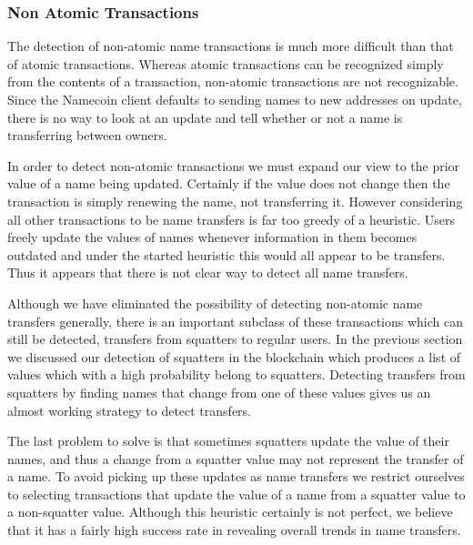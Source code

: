\subsubsection{Non Atomic Transactions}

The detection of non-atomic name transactions is much more difficult than that of atomic transactions. Whereas atomic transactions can be recognized simply from the contents of a transaction, non-atomic transactions are not recognizable.  Since the Namecoin client defaults to sending names to new addresses on update, there is no way to look at an update and tell whether or not a name is transferring between owners.

In order to detect non-atomic transactions we must expand our view to the prior value of a name being updated. Certainly if the value does not change then the transaction is simply renewing the name, not transferring it. However considering all other transactions to be name transfers is far too greedy of a heuristic. Users freely update the values of names whenever information in them becomes outdated and under the started heuristic this would all appear to be transfers. Thus it appears that there is not clear way to detect all name transfers.

Although we have eliminated the possibility of detecting non-atomic name transfers generally, there is an important subclass of these transactions which can still be detected, transfers from squatters to regular users. In the previous section we discussed our detection of squatters in the blockchain which produces a list of values which with a high probability belong to squatters. Detecting transfers from squatters by finding names that change from one of these values gives us an almost working strategy to detect transfers.

The last problem to solve is that sometimes squatters update the value of their names, and thus a change from a squatter value may not represent the transfer of a name. To avoid picking up these updates as name transfers we restrict ourselves to selecting transactions that update the value of a name from a squatter value to a non-squatter value. Although this heuristic certainly is not perfect, we believe that it has a fairly high success rate in revealing overall trends in name transfers.

\textbf{}
	
